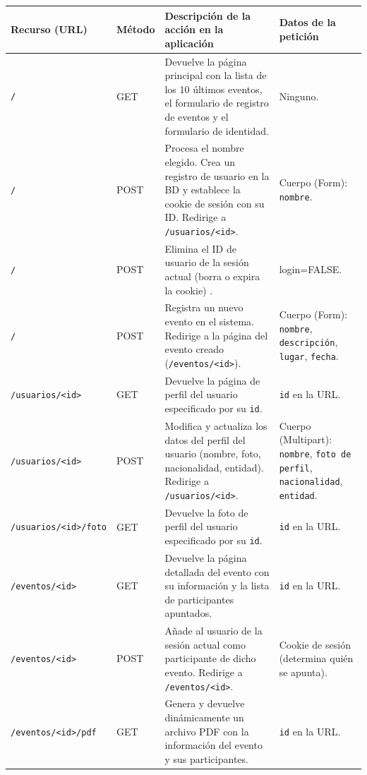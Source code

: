 \noindent
\begin{tabularx}{\textwidth}{l|l|X|X}
\toprule
\textbf{Recurso (URL)} & \textbf{Método} & \textbf{Descripción de la acción en la aplicación} & \textbf{Datos de la petición} \\ \midrule
\texttt{/} & GET & Devuelve la página principal con la lista de los 10 últimos eventos, el formulario de registro de eventos y el formulario de identidad. & Ninguno. \\ \midrule
\texttt{/} & POST & Procesa el nombre elegido. Crea un registro de usuario en la BD y establece la cookie de sesión con su ID. Redirige a \texttt{/usuarios/<id>}. & Cuerpo (Form): \texttt{nombre}. \\ \midrule
\texttt{/} & POST & Elimina el ID de usuario de la sesión actual (borra o expira la cookie) . & login=FALSE. \\ \midrule
\texttt{/} & POST & Registra un nuevo evento en el sistema. Redirige a la página del evento creado (\texttt{/eventos/<id>}). & Cuerpo (Form): \texttt{nombre}, \texttt{descripción}, \texttt{lugar}, \texttt{fecha}. \\ \midrule
\texttt{/usuarios/<id>} & GET & Devuelve la página de perfil del usuario especificado por su \texttt{id}. & \texttt{id} en la URL. \\ \midrule
\texttt{/usuarios/<id>} & POST & Modifica y actualiza los datos del perfil del usuario (nombre, foto, nacionalidad, entidad). Redirige a \texttt{/usuarios/<id>}. & Cuerpo (Multipart): \texttt{nombre}, 
\texttt{foto de perfil}, \texttt{nacionalidad}, \texttt{entidad}. \\ \midrule
\texttt{/usuarios/<id>/foto} & GET & Devuelve la foto de perfil del usuario especificado por su \texttt{id}. & \texttt{id} en la URL. \\ \midrule
\texttt{/eventos/<id>} & GET & Devuelve la página detallada del evento con su información y la lista de participantes apuntados. & \texttt{id} en la URL. \\ \midrule
\texttt{/eventos/<id>} & POST & Añade al usuario de la sesión actual como participante de dicho evento. Redirige a \texttt{/eventos/<id>}. & Cookie de sesión (determina quién se apunta). \\ \midrule
\texttt{/eventos/<id>/pdf} & GET & Genera y devuelve dinámicamente un archivo PDF con la información del evento y sus participantes. & \texttt{id} en la URL. \\
\bottomrule
\end{tabularx}

